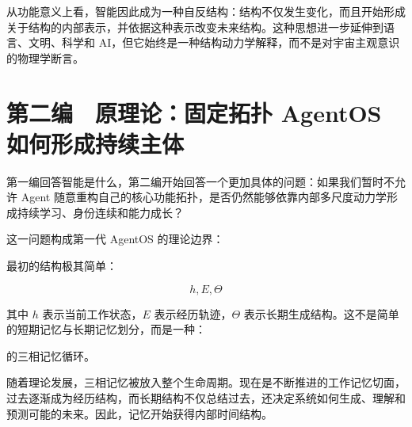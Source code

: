 从功能意义上看，智能因此成为一种自反结构：结构不仅发生变化，而且开始形成关于结构的内部表示，并依据这种表示改变未来结构。这种思想进一步延伸到语言、文明、科学和 AI，但它始终是一种结构动力学解释，而不是对宇宙主观意识的物理学断言。
























\part{第二编　原理论：固定拓扑 AgentOS 如何形成持续主体}
第一编回答智能是什么，第二编开始回答一个更加具体的问题：如果我们暂时不允许 Agent 随意重构自己的核心功能拓扑，是否仍然能够依靠内部多尺度动力学形成持续学习、身份连续和能力成长？

这一问题构成第一代 AgentOS 的理论边界：

\begin{statementbox}
\centering
{}
\end{statementbox}

最初的结构极其简单：

$$
\boxed{
h,E,\Theta
}
$$

其中 \(h\) 表示当前工作状态，\(E\) 表示经历轨迹，\(\Theta\) 表示长期生成结构。这不是简单的短期记忆与长期记忆划分，而是一种：

\begin{statementbox}
\centering
{}
\end{statementbox}

的三相记忆循环。

随着理论发展，三相记忆被放入整个生命周期。现在是不断推进的工作记忆切面，过去逐渐成为经历结构，而长期结构不仅总结过去，还决定系统如何生成、理解和预测可能的未来。因此，记忆开始获得内部时间结构。


